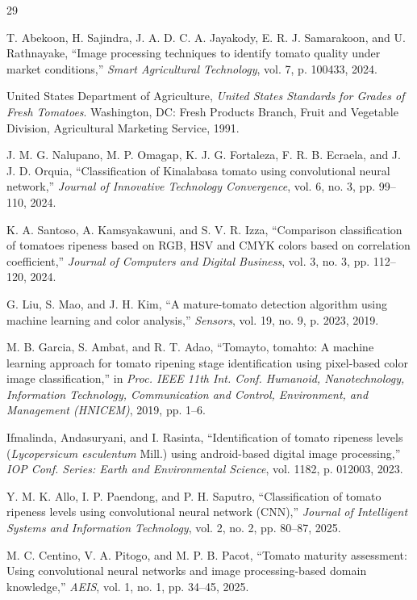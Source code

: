 \documentclass[journal]{IEEEtran}
\begin{document}
\begin{thebibliography}{29}

T. Abekoon, H. Sajindra, J. A. D. C. A. Jayakody, E. R. J. Samarakoon, and U. Rathnayake, ``Image processing techniques to identify tomato quality under market conditions,'' \emph{Smart Agricultural Technology}, vol. 7, p. 100433, 2024.

United States Department of Agriculture, \emph{United States Standards for Grades of Fresh Tomatoes}. Washington, DC: Fresh Products Branch, Fruit and Vegetable Division, Agricultural Marketing Service, 1991.

J. M. G. Nalupano, M. P. Omagap, K. J. G. Fortaleza, F. R. B. Ecraela, and J. J. D. Orquia, ``Classification of Kinalabasa tomato using convolutional neural network,'' \emph{Journal of Innovative Technology Convergence}, vol. 6, no. 3, pp. 99--110, 2024.

K. A. Santoso, A. Kamsyakawuni, and S. V. R. Izza, ``Comparison classification of tomatoes ripeness based on RGB, HSV and CMYK colors based on correlation coefficient,'' \emph{Journal of Computers and Digital Business}, vol. 3, no. 3, pp. 112--120, 2024.

G. Liu, S. Mao, and J. H. Kim, ``A mature-tomato detection algorithm using machine learning and color analysis,'' \emph{Sensors}, vol. 19, no. 9, p. 2023, 2019.

M. B. Garcia, S. Ambat, and R. T. Adao, ``Tomayto, tomahto: A machine learning approach for tomato ripening stage identification using pixel-based color image classification,'' in \emph{Proc. IEEE 11th Int. Conf. Humanoid, Nanotechnology, Information Technology, Communication and Control, Environment, and Management (HNICEM)}, 2019, pp. 1--6.

Ifmalinda, Andasuryani, and I. Rasinta, ``Identification of tomato ripeness levels (\textit{Lycopersicum esculentum} Mill.) using android-based digital image processing,'' \emph{IOP Conf. Series: Earth and Environmental Science}, vol. 1182, p. 012003, 2023.

Y. M. K. Allo, I. P. Paendong, and P. H. Saputro, ``Classification of tomato ripeness levels using convolutional neural network (CNN),'' \emph{Journal of Intelligent Systems and Information Technology}, vol. 2, no. 2, pp. 80--87, 2025.

M. C. Centino, V. A. Pitogo, and M. P. B. Pacot, ``Tomato maturity assessment: Using convolutional neural networks and image processing-based domain knowledge,'' \emph{AEIS}, vol. 1, no. 1, pp. 34--45, 2025.


\end{thebibliography}
\end{document}
